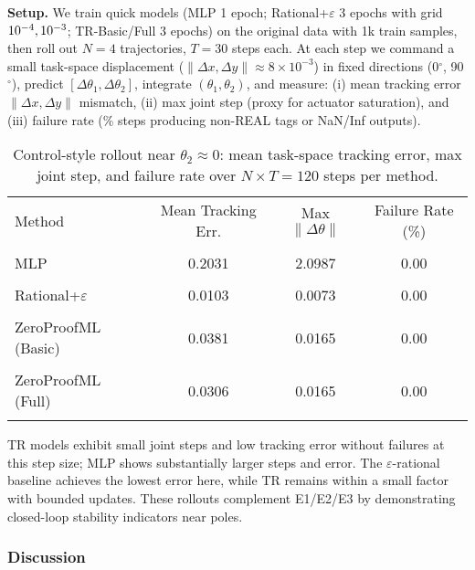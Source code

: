 \documentclass[11pt,twoside]{article}
\begin{document}
\textbf{Setup.} We train quick models (MLP 1 epoch; Rational+$\varepsilon$ 3 epochs with grid $\\{10^{-4},10^{-3}\\}$; TR-Basic/Full 3 epochs) on the original data with 1k train samples, then roll out $N=4$ trajectories, $T=30$ steps each. At each step we command a small task-space displacement ($\|\Delta x,\Delta y\|\approx 8\times10^{-3}$) in fixed directions (0$^{\circ}$, 90$^{\circ}$), predict $[\Delta\theta_1,\Delta\theta_2]$, integrate $(\theta_1,\theta_2)$, and measure: (i) mean tracking error $\|\Delta x,\Delta y\|$ mismatch, (ii) max joint step (proxy for actuator saturation), and (iii) failure rate (\% steps producing non-REAL tags or NaN/Inf outputs).

\begin{table}[h]
  \centering
  \small
  \begin{tabular}{lccc}
    \toprule
    Method & Mean Tracking Err. & Max $\|\Delta\theta\|$ & Failure Rate (\%) \\\\
    \midrule
    MLP & 0.2031 & 2.0987 & 0.00 \\\\
    Rational+$\varepsilon$ & 0.0103 & 0.0073 & 0.00 \\\\
    ZeroProofML (Basic) & 0.0381 & 0.0165 & 0.00 \\\\
    ZeroProofML (Full) & 0.0306 & 0.0165 & 0.00 \\\\
    \bottomrule
  \end{tabular}
  \caption{Control-style rollout near $\theta_2\approx 0$: mean task-space tracking error, max joint step, and failure rate over $N\times T=120$ steps per method.}
\end{table}

\noindent TR models exhibit small joint steps and low tracking error without failures at this step size; MLP shows substantially larger steps and error. The $\varepsilon$-rational baseline achieves the lowest error here, while TR remains within a small factor with bounded updates. These rollouts complement E1/E2/E3 by demonstrating closed-loop stability indicators near poles.


\subsubsection{Discussion}
\end{document}
